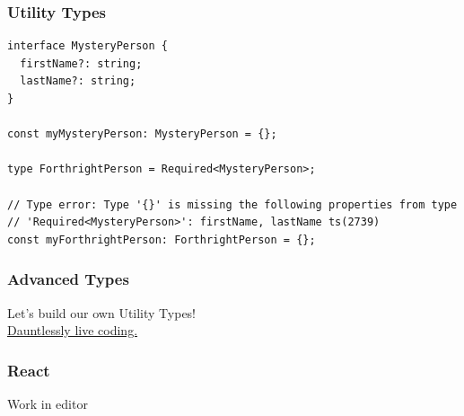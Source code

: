 \documentclass[aspectratio=169]{beamer}
\begin{document}
\begin{frame}[fragile]
  \frametitle{Utility Types}

  \begin{verbatim}
interface MysteryPerson {
  firstName?: string;
  lastName?: string;
}

const myMysteryPerson: MysteryPerson = {};

type ForthrightPerson = Required<MysteryPerson>;

// Type error: Type '{}' is missing the following properties from type
// 'Required<MysteryPerson>': firstName, lastName ts(2739)
const myForthrightPerson: ForthrightPerson = {};
  \end{verbatim}
\end{frame}

\begin{frame}[fragile]
  \frametitle{Advanced Types}

  Let's build our own Utility Types! \\

  \href{https://bit.ly/3a5OVs1}{Dauntlessly live coding.}
\end{frame}

\begin{frame}
  \frametitle{React}

  Work in editor
\end{frame}
\end{document}
